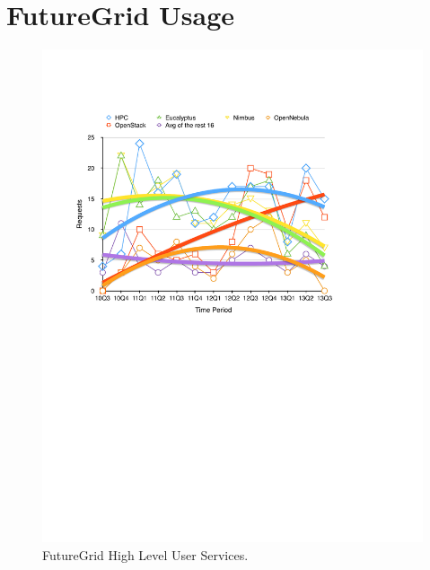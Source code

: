 
\section{FutureGrid Usage}

\begin{figure}[htb]
  \centering
    \includegraphics[width=1.0\textwidth]{images/fg-iaas-trend.pdf}
  \caption{FutureGrid High Level User Services.}
\end{figure}

